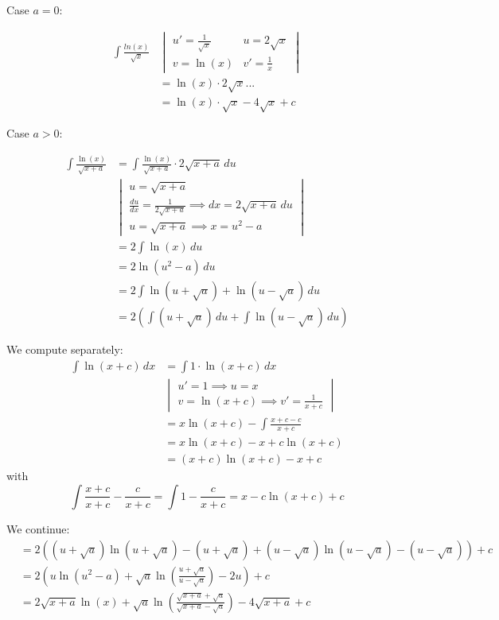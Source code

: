 \documentclass{article}
\begin{document}
Case $a = 0$:

\begin{align*}
  \int \frac{ln(x)}{\sqrt{x}}
    &\begin{vmatrix} u' = \frac1{\sqrt{x}} & u = 2\sqrt{x} \\ v = \ln(x) & v' = \frac{1}{x} \end{vmatrix} \\
    &= \ln(x) \cdot 2 \sqrt{x} ... \\
    &= \ln(x) \cdot \sqrt{x} - 4 \sqrt{x} + c
\end{align*}

Case $a > 0$:

\begin{align*}
  \int \frac{\ln(x)}{\sqrt{x + a}}
    &= \int \frac{\ln(x)}{\sqrt{x + a}} \cdot 2 \sqrt{x + a} \, du \\
    &\begin{vmatrix} u = \sqrt{x + a} \\ \frac{du}{dx} = \frac{1}{2\sqrt{x + a}} \implies dx = 2\sqrt{x + a} \, du \\ u = \sqrt{x + a} \implies x = u^2 - a \end{vmatrix} \\
    &= 2\int \ln(x) \, du \\
    &= 2 \ln(u^2 - a) \, du \\
    &= 2 \int \ln(u + \sqrt{a}) + \ln(u - \sqrt{a}) \, du \\
    &= 2 \left(\int (u + \sqrt{a}) \, du + \int \ln(u - \sqrt{a}) \, du\right)
\end{align*}

We compute separately:
\begin{align*}
  \int \ln(x + c) \, dx
    &= \int 1 \cdot \ln(x + c) \, dx \\
    &\begin{vmatrix} u' = 1 \implies u = x \\ v = \ln(x + c) \implies v' = \frac{1}{x + c} \end{vmatrix} \\
    &= x \ln(x + c) - \int \frac{x + c - c}{x + c}  \\
    &= x \ln(x + c) - x + c \ln(x + c) \\
    &= (x + c) \ln(x + c) - x + c
\end{align*}
with
\[ \int \frac{x + c}{x + c} - \frac{c}{x + c} = \int 1 - \frac{c}{x + c} = x - c \ln(x + c) + c \]

We continue:
\begin{align*}
  &= 2 ((u + \sqrt{a}) \ln(u + \sqrt{a}) - (u + \sqrt{a}) + (u - \sqrt{a}) \ln (u - \sqrt{a}) - (u - \sqrt{a})) + c \\
  &= 2 (u \ln(u^2 - a) + \sqrt{a} \ln\left(\frac{u + \sqrt{a}}{u - \sqrt{a}}\right) - 2u) + c \\
  &= 2\sqrt{x + a} \ln(x) + \sqrt{a} \ln\left(\frac{\sqrt{x + a} + \sqrt{a}}{\sqrt{x + a} - \sqrt{a}}\right) - 4\sqrt{x + a} + c
\end{align*}
\end{document}
